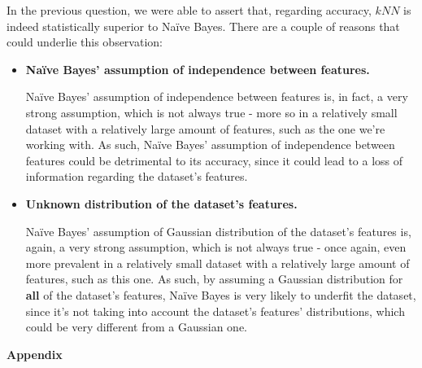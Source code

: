 \documentclass[12pt]{article}
\begin{document}
\begin{enumerate}[leftmargin=\labelsep,resume]
        \vspace*{0.5cm}

        In the previous question, we were able to assert that, regarding accuracy, $kNN$ is
        indeed statistically superior to Naïve Bayes. There are a couple of reasons
        that could underlie this observation:

        \begin{itemize}
          \item \textbf{Naïve Bayes' assumption of independence between features.}

                Naïve Bayes' assumption of independence between features is, in fact, a very
                strong assumption, which is not always true - more so in a relatively small dataset
                with a relatively large amount of features, such as the one we're working with.
                As such, Naïve Bayes' assumption of independence between features could be
                detrimental to its accuracy, since it could lead to a loss of information
                regarding the dataset's features.

          \item \textbf{Unknown distribution of the dataset's features.}

                Naïve Bayes' assumption of Gaussian distribution of the dataset's features
                is, again, a very strong assumption, which is not always true - once again,
                even more prevalent in a relatively small dataset with a relatively large
                amount of features, such as this one. As such, by assuming a Gaussian distribution
                for \textbf{all} of the dataset's features, Naïve Bayes is very likely to
                underfit the dataset, since it's not taking into account the dataset's
                features' distributions, which could be very different from a Gaussian one.
        \end{itemize}

\end{enumerate}

\pagebreak

\large{\textbf{Appendix}\vskip 0.3cm}


\end{document}
